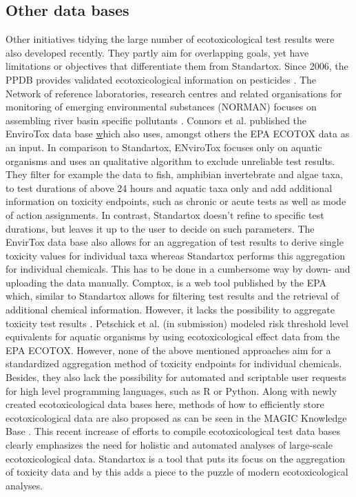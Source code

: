 \subsection*{Other data bases}
Other initiatives tidying the large number of ecotoxicological test results were also developed recently. They partly aim for overlapping goals, yet have limitations or objectives that differentiate them from Standartox. Since 2006, the PPDB provides validated ecotoxicological information on pesticides \citep{lewis_international_2016}.
The Network of reference laboratories, research centres and related organisations for monitoring of emerging environmental substances (NORMAN) focuses on assembling river basin specific pollutants \citep{von_der_ohe_new_2011}. 
Connors et al. \citet{healthandenvironmentalsciencesinstitutehesi_envirotox_2019, connors_creation_2019} published the EnviroTox data base \href{https://envirotoxdatabase.org/} which also uses, amongst others the EPA ECOTOX data as an input. In comparison to Standartox, ENviroTox focuses only on aquatic organisms and uses an qualitative algorithm to exclude unreliable test results. They filter for example the data to fish, amphibian invertebrate and algae taxa, to test durations of above 24 hours and aquatic taxa only and add additional information on toxicity endpoints, such as chronic or acute tests as well as mode of action assignments. In contrast, Standartox doesn't refine to specific test durations, but leaves it up to the user to decide on such parameters. The EnvirTox data base also allows for an aggregation of test results to derive single toxicity values for individual taxa whereas Standartox performs this aggregation for individual chemicals. This has to be done in a cumbersome way by down- and uploading the data manually. Comptox, is a web tool published by the EPA which, similar to Standartox allows for filtering test results and the retrieval of additional chemical information. However, it lacks the possibility to aggregate toxicity test results \citep{usenvironmentalprotectionagency_comptox_2019}. Petschick et al. (in submission) modeled risk threshold level equivalents for aquatic organisms by using ecotoxicological effect data from the EPA ECOTOX. However, none of the above mentioned approaches aim for a standardized aggregation method of toxicity endpoints for individual chemicals. Besides, they also lack the possibility for automated and scriptable user requests for high level programming languages, such as R or Python. Along with newly created ecotoxicological data bases here, methods of how to efficiently store ecotoxicological data are also proposed as can be seen in the MAGIC Knowledge Base \citep{bub_graphing_2019}. This recent increase of efforts to compile ecotoxicological test data bases clearly emphasizes the need for holistic and automated analyses of large-scale ecotoxicological data. Standartox is a tool that puts its focus on the aggregation of toxicity data and by this adds a piece to the puzzle of modern ecotoxicological analyses.

